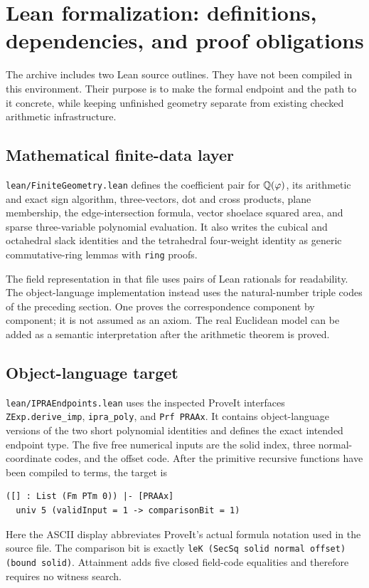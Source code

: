 \section{Lean formalization: definitions, dependencies, and proof obligations}
\label{sec:lean}
The archive includes two Lean source outlines. They have not been
compiled in this environment. Their purpose is to make the formal
endpoint and the path to it concrete, while keeping unfinished
geometry separate from existing checked arithmetic infrastructure.

\subsection{Mathematical finite-data layer}
\texttt{lean/FiniteGeometry.lean} defines the coefficient pair for
$\mathbb Q(\varphi)$, its arithmetic and exact sign algorithm, three-vectors,
dot and cross products, plane membership, the edge-intersection
formula, vector shoelace squared area, and sparse three-variable
polynomial evaluation. It also writes the cubical and octahedral
slack identities and the tetrahedral four-weight identity as generic
commutative-ring lemmas with \texttt{ring} proofs.

The field representation in that file uses pairs of Lean rationals
for readability. The object-language implementation instead uses the
natural-number triple codes of the preceding section. One proves
the correspondence component by component; it is not assumed as an
axiom. The real Euclidean model can be added as a semantic
interpretation after the arithmetic theorem is proved.

\subsection{Object-language target}
\texttt{lean/IPRAEndpoints.lean} uses the inspected ProveIt interfaces
\texttt{ZExp.derive\_imp}, \texttt{ipra\_poly}, and
\texttt{Prf PRAAx}. It contains object-language versions of the two
short polynomial identities and defines the exact intended endpoint
type. The five free numerical inputs are the solid index, three
normal-coordinate codes, and the offset code. After the primitive
recursive functions have been compiled to terms, the target is
\begin{lstlisting}
([] : List (Fm PTm 0)) |- [PRAAx]
  univ 5 (validInput = 1 -> comparisonBit = 1)
\end{lstlisting}
Here the ASCII display abbreviates ProveIt's actual formula notation
used in the source file. The comparison bit is exactly
\texttt{leK (SecSq solid normal offset) (bound solid)}.
Attainment adds five closed field-code equalities and therefore
requires no witness search.

